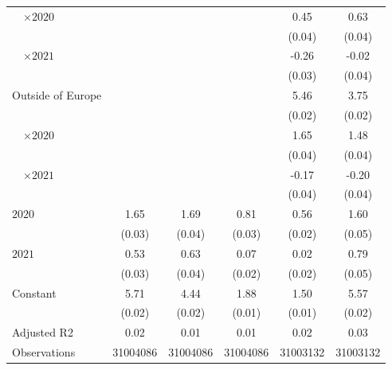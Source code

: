 \begin{tabular}{@{}l*{5}{S[table-format={-}2.2{\tnote{***}}]}@{}}
~~\(\times 2020\) &  &  &  & 0.45\tnote{***} & 0.63\tnote{***}\tabularnewline%
 &  &  &  & (0.04) & \vphantom{2} (0.04)\tabularnewline%
~~\(\times 2021\) &  &  &  & -0.26\tnote{***} & -0.02\tabularnewline%
 &  &  &  & (0.03) & (0.04)\tabularnewline%
Outside of Europe &  &  &  & 5.46\tnote{***} & 3.75\tnote{***}\tabularnewline%
 &  &  &  & (0.02) & (0.02)\tabularnewline%
~~\(\times 2020\) &  &  &  & 1.65\tnote{***} & 1.48\tnote{***}\tabularnewline%
 &  &  &  & (0.04) & \vphantom{1} (0.04)\tabularnewline%
~~\(\times 2021\) &  &  &  & -0.17\tnote{***} & -0.20\tnote{***}\tabularnewline%
 &  &  &  & (0.04) & (0.04)\tabularnewline%
\midrule
\(2020\) & 1.65\tnote{***} & 1.69\tnote{***} & 0.81\tnote{***} & 0.56\tnote{***} & 1.60\tnote{***}\tabularnewline%
 & (0.03) & (0.04) & (0.03) & (0.02) & (0.05)\tabularnewline%
\(2021\) & 0.53\tnote{***} & 0.63\tnote{***} & 0.07\tnote{**} & 0.02 & 0.79\tnote{***}\tabularnewline%
 & (0.03) & (0.04) & (0.02) & (0.02) & (0.05)\tabularnewline%
Constant & 5.71\tnote{***} & 4.44\tnote{***} & 1.88\tnote{***} & 1.50\tnote{***} & 5.57\tnote{***}\tabularnewline%
 & (0.02) & (0.02) & (0.01) & (0.01) & (0.02)\tabularnewline%
\midrule
Adjusted R2 & 0.02 & 0.01 & 0.01 & 0.02 & 0.03\tabularnewline%
Observations & {\num{31004086}} & {\num{31004086}} & {\num{31004086}} & {\num{31003132}} & {\num{31003132}}\tabularnewline%
\bottomrule
\end{tabular}
